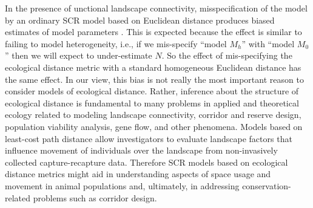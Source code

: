 In the presence of unctional landscape connectivity, misspecification
of the model by an ordinary SCR model based on Euclidean distance
produces biased estimates of model parameters
 \citep{royle_etal:2012ecol}.
 This is expected because the effect is similar
to failing to model heterogeneity, i.e., if we mis-specify ``model
$M_h$'' \citep{otis_etal:1978} with ``model $M_0$''
\citep{otis_etal:1978} then we will expect to under-estimate $N$. So
the effect of mis-specifying the ecological distance metric with a
standard homogeneous Euclidean distance has the same effect. 
In our view, this bias is not really the most important reason to
consider models of ecological distance. Rather, inference about the
structure of ecological distance is fundamental to many problems in
applied and theoretical ecology related to modeling landscape
connectivity, corridor and reserve design, population viability
analysis, gene flow, and other phenomena.  Models based on least-cost
path distance allow investigators to evaluate landscape factors that
influence movement of individuals over the landscape from
non-invasively collected capture-recapture data.  Therefore SCR models
based on ecological distance metrics might aid in understanding
aspects of space usage and movement in animal populations and,
ultimately, in addressing conservation-related problems such as
corridor design.





























